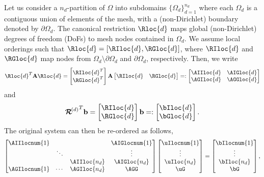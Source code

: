 \documentclass{article}
\begin{document}
Let us consider a $n_d$-partition of $\Omega$ into subdomains $\{\Omega_d\}_{d=1}^{n_d}$ where each $\Omega_d$ is a contiguous union of elements of the mesh, with a (non-Dirichlet) boundary denoted by $\partial\Omega_d$.
The canonical restriction $\Rloc{d}$ maps global (non-Dirichlet) degrees of freedom (DoFs) to mesh nodes contained in $\Omega_d$.
We assume local orderings such that $\Rloc{d}=[\RIloc{d},\RGloc{d}]$,
where $\RIloc{d}$ and $\RGloc{d}$ map nodes from $\Omega_d\setminus\partial\Omega_d$ and $\partial\Omega_d$, respectively.
Then, we write
\begin{align}\label{eq:010}
\Rloc{d}^T\mathbf{A}\Rloc{d}=
\begin{bmatrix}
\RIloc{d}^T\\
\RGloc{d}^T
\end{bmatrix}
\mathbf{A}
\begin{bmatrix}
\RIloc{d}&\RGloc{d}
\end{bmatrix}=:
\begin{bmatrix}
\AIIloc{d}&\AIGloc{d}\\
\AGIloc{d}&\AGGloc{d}
\end{bmatrix}
\end{align}
and
\begin{align}\label{eq:015}
{\boldsymbol{\mathcal{R}}^{\!(d)}}^T\mathbf{b}=
\begin{bmatrix}
\RIloc{d}\\
\RGloc{d}
\end{bmatrix}
\mathbf{b}=:
\begin{bmatrix}
\bIloc{d}\\
\bGloc{d}
\end{bmatrix}.
\end{align}
The original system can then be re-ordered as follows,
\begin{align}\label{eq:020}
\begin{bmatrix}
\AIIlocnum{1}&      &            &\AIGlocnum{1}\\
             &\ddots&            &\vdots       \\
             &      &\AIIloc{n_d}&\AIGloc{n_d} \\
\AGIlocnum{1}&\cdots&\AGIloc{n_d}&\AGG
\end{bmatrix}
\begin{bmatrix}
\uIlocnum{1}\\
\vdots      \\
\uIloc{n_d} \\
\uG
\end{bmatrix}
=
\begin{bmatrix}
\bIlocnum{1}\\
\vdots      \\
\bIloc{n_d} \\
\bG
\end{bmatrix},
\end{align}
\end{document}
